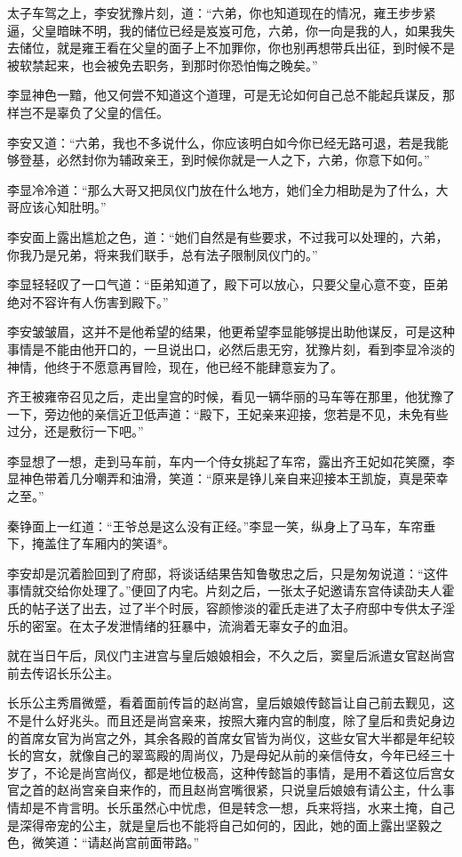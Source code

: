 太子车驾之上，李安犹豫片刻，道：“六弟，你也知道现在的情况，雍王步步紧逼，父皇暗昧不明，我的储位已经是岌岌可危，六弟，你一向是我的人，如果我失去储位，就是雍王看在父皇的面子上不加罪你，你也别再想带兵出征，到时候不是被软禁起来，也会被免去职务，到那时你恐怕悔之晚矣。”

李显神色一黯，他又何尝不知道这个道理，可是无论如何自己总不能起兵谋反，那样岂不是辜负了父皇的信任。

李安又道：“六弟，我也不多说什么，你应该明白如今你已经无路可退，若是我能够登基，必然封你为辅政亲王，到时候你就是一人之下，六弟，你意下如何。”

李显冷冷道：“那么大哥又把凤仪门放在什么地方，她们全力相助是为了什么，大哥应该心知肚明。”

李安面上露出尴尬之色，道：“她们自然是有些要求，不过我可以处理的，六弟，你我乃是兄弟，将来我们联手，总有法子限制凤仪门的。”

李显轻轻叹了一口气道：“臣弟知道了，殿下可以放心，只要父皇心意不变，臣弟绝对不容许有人伤害到殿下。”

李安皱皱眉，这并不是他希望的结果，他更希望李显能够提出助他谋反，可是这种事情是不能由他开口的，一旦说出口，必然后患无穷，犹豫片刻，看到李显冷淡的神情，他终于不愿意再冒险，现在，他已经不能肆意妄为了。

齐王被雍帝召见之后，走出皇宫的时候，看见一辆华丽的马车等在那里，他犹豫了一下，旁边他的亲信近卫低声道：“殿下，王妃亲来迎接，您若是不见，未免有些过分，还是敷衍一下吧。”

李显想了一想，走到马车前，车内一个侍女挑起了车帘，露出齐王妃如花笑黡，李显神色带着几分嘲弄和油滑，笑道：“原来是铮儿亲自来迎接本王凯旋，真是荣幸之至。”

秦铮面上一红道：“王爷总是这么没有正经。”李显一笑，纵身上了马车，车帘垂下，掩盖住了车厢内的笑语*。

李安却是沉着脸回到了府邸，将谈话结果告知鲁敬忠之后，只是匆匆说道：“这件事情就交给你处理了。”便回了内宅。片刻之后，一张太子妃邀请东宫侍读劭夫人霍氏的帖子送了出去，过了半个时辰，容颜惨淡的霍氏走进了太子府邸中专供太子淫乐的密室。在太子发泄情绪的狂暴中，流淌着无辜女子的血泪。

就在当日午后，凤仪门主进宫与皇后娘娘相会，不久之后，窦皇后派遣女官赵尚宫前去传诏长乐公主。

长乐公主秀眉微蹙，看着面前传旨的赵尚宫，皇后娘娘传懿旨让自己前去觐见，这不是什么好兆头。而且还是尚宫亲来，按照大雍内宫的制度，除了皇后和贵妃身边的首席女官为尚宫之外，其余各殿的首席女官皆为尚仪，这些女官大半都是年纪较长的宫女，就像自己的翠鸾殿的周尚仪，乃是母妃从前的亲信侍女，今年已经三十岁了，不论是尚宫尚仪，都是地位极高，这种传懿旨的事情，是用不着这位后宫女官之首的赵尚宫亲自来作的，而且赵尚宫嘴很紧，只说皇后娘娘有请公主，什么事情却是不肯言明。长乐虽然心中忧虑，但是转念一想，兵来将挡，水来土掩，自己是深得帝宠的公主，就是皇后也不能将自己如何的，因此，她的面上露出坚毅之色，微笑道：“请赵尚宫前面带路。”


